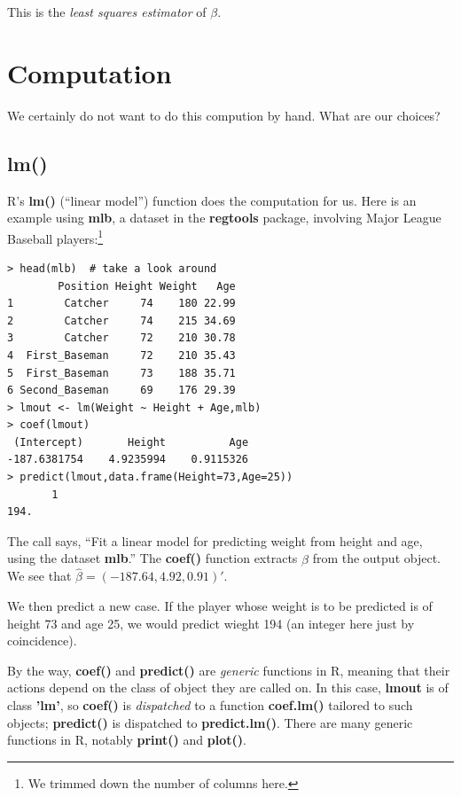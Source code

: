 This is the \textit{least squares estimator} of $\beta$.

\section{Computation}

We certainly do not want to do this compution by hand.  What are our
choices?

\subsection{lm()}

R's \textbf{lm()} (``linear model'') function does the computation for
us.  Here is an example using \textbf{mlb}, a dataset in the
\textbf{regtools} package, involving Major League Baseball
players:\footnote{We trimmed down the number of columns here.}

\begin{lstlisting}
> head(mlb)  # take a look around
        Position Height Weight   Age
1        Catcher     74    180 22.99
2        Catcher     74    215 34.69
3        Catcher     72    210 30.78
4  First_Baseman     72    210 35.43
5  First_Baseman     73    188 35.71
6 Second_Baseman     69    176 29.39
> lmout <- lm(Weight ~ Height + Age,mlb)
> coef(lmout)
 (Intercept)       Height          Age 
-187.6381754    4.9235994    0.9115326 
> predict(lmout,data.frame(Height=73,Age=25))
       1 
194.
\end{lstlisting}

The call says, ``Fit a linear model for predicting weight from height
and age, using the dataset \textbf{mlb}.''  The \textbf{coef()} function
extracts $\widehat{\beta}$ from the output object.  We see that
$\widehat{\beta} = (-187.64,4.92,0.91)'$. 

We then predict a new case.  If the player whose weight is to be
predicted is of height 73 and age 25, we would predict wieght 194 (an
integer here just by coincidence).

By the way, \textbf{coef()} and \textbf{predict()} are \textit{generic}
functions in R, meaning that their actions depend on the class of object
they are called on.  In this case, \textbf{lmout} is of class
\textbf{'lm'}, so \textbf{coef()} is \textit{dispatched} to a function
\textbf{coef.lm()} tailored to such objects; \textbf{predict()} is
dispatched to \textbf{predict.lm()}.  There are many generic functions
in R, notably \textbf{print()} and \textbf{plot()}.

